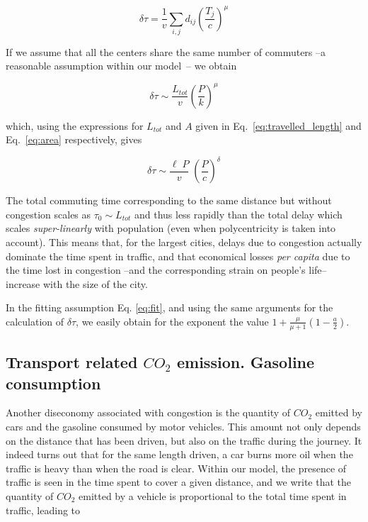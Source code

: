 \begin{equation} 
    \delta \tau = \frac{1}{v} \sum_{i,j} d_{ij} \left(\frac{T_j}{c} \right)^\mu 
\end{equation}

If we assume that all the centers share the same number of commuters --a
reasonable assumption within our model~\cite{Louf:2013}-- we obtain

\begin{equation} 
    \delta \tau \sim \frac{L_{tot}}{v} \left( \frac{P}{k}
\right)^{\mu} 
\end{equation} 

which, using the expressions for $L_{tot}$ and $A$
given in Eq.~\ref{eq:travelled_length} and Eq.~\ref{eq:area} respectively, gives

\begin{equation} 
    \delta \tau \sim \frac{\ell\; P}{v}\;\left(\frac{P}{c}\right)^{\delta} 
\end{equation}

The total commuting time corresponding to the same distance but without
congestion scales as $\tau_0\sim L_{tot}$ and thus less rapidly than the total
delay which scales \emph{super-linearly} with population (even when
polycentricity is taken into account). This means that, for the largest cities,
delays due to congestion actually dominate the time spent in traffic, and that
economical losses \emph{per capita} due to the time lost in congestion --and the
corresponding strain on people's life-- increase with the size of the city. 

In the fitting assumption Eq. \ref{eq:fit}, and using the same arguments for the
calculation of $\delta\tau$, we easily obtain for the exponent the value
$1+\frac{\mu}{\mu+1}\left(1-\frac{a}{2}\right)$.

\subsection{Transport related $CO_2$ emission. Gasoline consumption}

Another diseconomy associated with congestion is the quantity of $CO_2$ emitted by cars and the gasoline consumed by motor vehicles. This amount not only depends on the distance that has been driven, but also on the traffic during the journey. It indeed turns out that for the same length driven, a car burns more oil when the traffic is heavy than when the road is clear.  Within our model, the presence of traffic is seen in the time spent to cover a given distance, and we write that the quantity of $CO_2$ emitted by a vehicle is proportional to the total time spent in traffic, leading to

